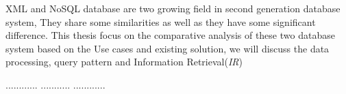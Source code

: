 XML and NoSQL database are two growing field in second generation database system, They share some similarities as well as they have some significant difference. 
This thesis focus on the  comparative analysis of these two database system based on the Use cases and existing solution, we will discuss the data processing, query pattern and  Information Retrieval(\textit{IR})

............
...........
............